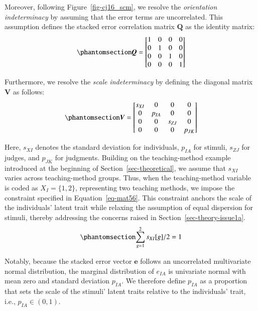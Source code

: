 \documentclass[
  authoryear,
  review,
  1p]{elsarticle}
\begin{document}
Moreover, following Figure~\ref{fig-cj16_scm}, we resolve the
\emph{orientation indeterminacy} by assuming that the error terms are
uncorrelated. This assumption defines the stacked error correlation
matrix \(\boldsymbol{Q}\) as the identity matrix:
\begin{equation}\protect\phantomsection\label{eq-mat54}{
\boldsymbol{Q} = \begin{bmatrix}
    1 & 0 & 0 & 0 \\
    0 & 1 & 0 & 0 \\
    0 & 0 & 1 & 0 \\
    0 & 0 & 0 & 1 
  \end{bmatrix}
}\end{equation}

Furthermore, we resolve the \emph{scale indeterminacy} by defining the
diagonal matrix \(\boldsymbol{V}\) as follows:
\begin{equation}\protect\phantomsection\label{eq-mat55}{
\boldsymbol{V} = \begin{bmatrix}
    s_{XI} & 0 & 0 & 0 \\
    0 & p_{IA} & 0 & 0 \\
    0 & 0 & s_{ZJ} & 0 \\
    0 & 0 & 0 & p_{JK} 
  \end{bmatrix}
}\end{equation}

Here, \(s_{XI}\) denotes the standard deviation for individuals,
\(p_{IA}\) for stimuli, \(s_{ZJ}\) for judges, and \(p_{JK}\) for
judgments. Building on the teaching-method example introduced at the
beginning of Section~\ref{sec-theoretical}, we assume that \(s_{XI}\)
varies across teaching-method groups. Thus, when the teaching-method
variable is coded as \(X_{I} = \{1,2\}\), representing two teaching
methods, we impose the constraint specified in Equation~\ref{eq-mat56}.
This constraint anchors the scale of the individuals' latent trait while
relaxing the assumption of equal dispersion for stimuli, thereby
addressing the concerns raised in Section~\ref{sec-theory-issue1a}.
\begin{equation}\protect\phantomsection\label{eq-mat56}{
\sum_{g=1}^{2} s_{XI}[g]/2 = 1
}\end{equation}

Notably, because the stacked error vector \(\boldsymbol{e}\) follows an
uncorrelated multivariate normal distribution, the marginal distribution
of \(e_{IA}\) is univariate normal with mean zero and standard deviation
\(p_{IA}\). We therefore define \(p_{IA}\) as a proportion that sets the
scale of the stimuli' latent traits relative to the individuals' trait,
i.e., \(p_{IA} \in (0,1)\).
\end{document}
